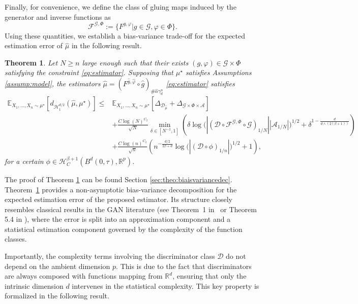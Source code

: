 \documentclass[10pt]{article}
\newtheorem{theorem}{Theorem}
\begin{document}
Finally, for convenience, we define the class of gluing maps induced by the generator and inverse functions as
\begin{equation}\label{eq:fgphi}
    \mathcal{F}^{\mathcal{G},\Phi}:=\{F^{g,\varphi}|g\in \mathcal{G}, \varphi \in \Phi\}.
\end{equation}
Using these quantities, we establish a bias-variance trade-off for the expected estimation error of \( \hat{\mu} \) in the following result.
\begin{theorem}\label{theo:biaisvariancedec} Let 
$N\geq n$ large enough such that their exists $(g,\varphi)\in  \mathcal{G}\times  \Phi$ satisfying the constraint \eqref{eq:estimator}. Supposing that $\mu^\star$ satisfies Assumptions  \ref{assump:model}, the estimators $\hat{\mu}=(F^{\hat{g},\hat{\varphi}}\circ \hat{g})_{\# \hat{\alpha}\gamma_d^n}$ \eqref{eq:estimator} satisfies
   \begin{align*}
 \mathbb{E}_{X_1,...,X_n\sim \mu^\star}[d_{\mathcal{H}^{d/2}_1}(\hat{\mu},\mu^\star)]\leq & \mathbb{E}_{X_1,...,X_n\sim \mu^\star}[\Delta_{\mathcal{D}_{\hat{\mu}}}+\Delta_{\mathcal{G}\times \Phi \times \mathcal{A}}]\\
  &+ \frac{C\log(N)^{C_2}}{\sqrt{N}} \min \limits_{\delta\in [N^{-1},1]}  \left( \delta\log\Big(|(\mathcal{D}\circ\mathcal{F}^{\mathcal{G},\Phi}\circ \mathcal{G})_{1/N}||\mathcal{A}_{1/N}|\Big)^{1/2}+\delta^{1-\frac{d}{d\wedge(2(\beta+1))}}\right)\\
 & +\frac{C\log(n)^{C_2}}{\sqrt{n}}\left( n^{-\frac{d/2}{2\beta+d}}\log\Big(|(\mathcal{D}\circ \phi)_{1/n}|\Big)^{1/2}+1\right),
\end{align*}
for a certain $\phi\in \mathcal{H}^{\beta+1}_C(B^d(0,\tau),\mathbb{R}^p)$.
\end{theorem}
The proof of Theorem \ref{theo:biaisvariancedec} can be found Section \ref{sec:theo:biaisvariancedec}. Theorem~\ref{theo:biaisvariancedec} provides a non-asymptotic bias-variance decomposition for the expected estimation error of the proposed estimator. Its structure closely resembles classical results in the GAN literature (see Theorem~1 in~\cite{puchkin2024rates} or Theorem 5.4 in \cite{stephanovitch2023wasserstein}), where the error is split into an approximation component and a statistical estimation component governed by the complexity of the function classes.

Importantly, the complexity terms involving the discriminator class \( \mathcal{D} \) do not depend on the ambient dimension \( p \). This is due to the fact that discriminators are always composed with functions mapping from \( \mathbb{R}^d \), ensuring that only the intrinsic dimension \( d \) intervenes in the statistical complexity. This key property is formalized in the following result.
\end{document}
